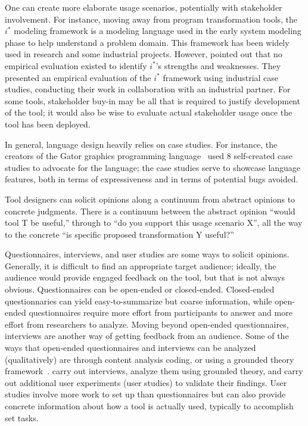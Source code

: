 One can create more elaborate usage scenarios, potentially
with stakeholder involvement.
For instance, moving away from program transformation tools, the $i^*$ modeling framework is a modeling language used in the early
system modeling phase to help understand a problem domain. This
framework has been widely used in research and some industrial
projects. However,  pointed out that no
empirical evaluation existed to identify $i^*$'s strengths and
weaknesses. They presented an empirical evaluation of the $i^*$
framework using industrial case studies, conducting their work in
collaboration with an industrial partner. 
For some tools, stakeholder buy-in may be all that is required
to justify development of the tool; it would also be wise to
evaluate actual stakeholder usage once the tool has been deployed.

In general, language design heavily relies on case studies.
For instance, the creators of the Gator graphics programming language~\cite{geisler20:_geomet_types_graph_progr} used 8 self-created case studies to advocate for the language; the case studies serve to showcase language features, both in terms of expressiveness and in terms of potential bugs avoided.

Tool designers can solicit opinions along a continuum from abstract
opinions to concrete judgments. There is a continuum between the
abstract opinion ``would tool T be useful,'' through to ``do you
support this usage scenario X'', all the way to the concrete ``is
specific proposed transformation Y useful?''

Questionnaires, interviews, and user studies are some ways to solicit opinions. 
Generally, it is difficult to find an appropriate
target audience; ideally, the audience would provide engaged feedback
on the tool, but that is not always obvious.  Questionnaires can be
open-ended or closed-ended. Closed-ended questionnaries can yield
easy-to-summarize but coarse information, while open-ended
questionnaires require more effort from participants to answer and
more effort from researchers to analyze. Moving beyond open-ended
questionnaires, interviews are another way of getting feedback
from an audience. Some of the ways that open-ended questionnaires and interviews can be 
analyzed (qualitatively) are through content analysis coding, or 
using a grounded theory framework~\cite{glaser67:_discov_groun_theor}.
 carry out interviews, analyze them using grounded
theory, and carry out additional user experiments (user studies)
to validate their findings.
User studies involve more work to set up than questionnaires but can also provide concrete
information about how a tool is actually used, typically to accomplish set tasks.

